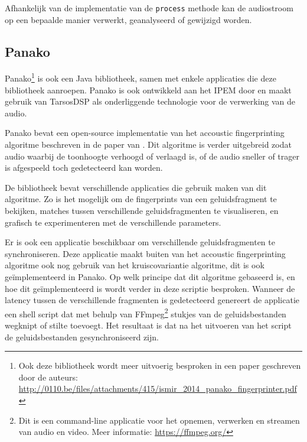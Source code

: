 Afhankelijk van de implementatie van de \texttt{process} methode kan de audiostroom op een bepaalde manier verwerkt, geanalyseerd of gewijzigd worden.

\subsection{Panako}

Panako\footnote{Ook deze bibliotheek wordt meer uitvoerig besproken in een paper geschreven door de auteurs: \url{http://0110.be/files/attachments/415/ismir_2014_panako_fingerprinter.pdf}\cite{six2014panako}} is ook een Java bibliotheek, samen met enkele applicaties die deze bibliotheek aanroepen. Panako is ook ontwikkeld aan het IPEM door  en maakt gebruik van TarsosDSP als onderliggende technologie voor de verwerking van de audio.

Panako bevat een open-source implementatie van het accoustic fingerprinting algoritme beschreven in de paper van . Dit algoritme is verder uitgebreid zodat audio waarbij de toonhoogte verhoogd of verlaagd is, of de audio sneller of trager is afgespeeld toch gedetecteerd kan worden.

De bibliotheek bevat verschillende applicaties die gebruik maken van dit algoritme. Zo is het mogelijk om de fingerprints van een geluidsfragment te bekijken, matches tussen verschillende geluidsfragmenten te visualiseren, en grafisch te experimenteren met de verschillende parameters.

Er is ook een applicatie beschikbaar om verschillende geluidsfragmenten te synchroniseren. Deze applicatie maakt buiten van het accoustic fingerprinting algoritme ook nog gebruik van het kruiscovariantie algoritme, dit is ook geïmplementeerd in Panako. Op welk principe dat dit algoritme gebaseerd is, en hoe dit geïmplementeerd is wordt verder in deze scriptie besproken. Wanneer de latency tussen de verschillende fragmenten is gedetecteerd genereert de applicatie een shell script dat met behulp van FFmpeg\footnote{Dit is een command-line applicatie voor het opnemen, verwerken en streamen van audio en video. Meer informatie: \url{https://ffmpeg.org/}} stukjes van de geluidsbestanden wegknipt of stilte toevoegt. Het resultaat is dat na het uitvoeren van het script de geluidsbestanden gesynchroniseerd zijn.

